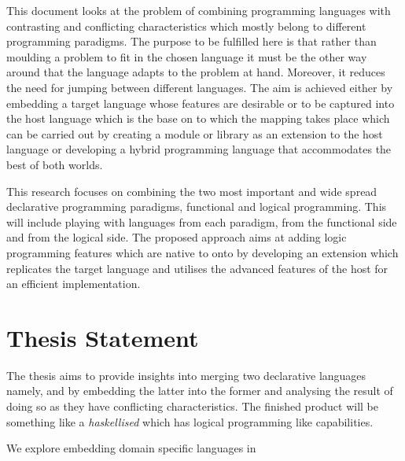 \begin{unbcabstract}
This document looks at the problem of combining programming languages with contrasting and conflicting 
characteristics which mostly belong to different pro\-gram\-ming pa\-ra\-digms. The purpose to be fulfilled here is that 
rather than moulding a problem to fit in the chosen language it must be the other way around that the language 
adapts to the problem at hand. Moreover, it reduces the need for jumping between different  languages. The aim is 
achieved either by embedding a target language  whose features are desirable or to be captured into the host 
language which is the base on to which the mapping takes place which can be carried out by creating a module or 
library as an extension to the host language or developing a hybrid programming language that accommodates the 
best of both worlds.  

This research focuses on combining the two most important and wide spread declarative programming paradigms, 
functional and logical programming. This will include playing with languages from each paradigm, 
 from the functional side and  from the logical side. The proposed approach 
aims at adding logic programming features which are native to  onto  by 
developing an extension which replicates the target language and utilises the advanced features of the host for an 
efficient implementation.      

\section{Thesis Statement}

The thesis  aims to provide insights into merging two declarative languages namely,  and  by embedding 
the latter into the former and analysing the result of doing so as they have conflicting characteristics. The finished product will be 
something like a \textit{haskellised}  which has logical programming like capabilities.       

We explore embedding domain specific languages in  

       
\end{unbcabstract}

